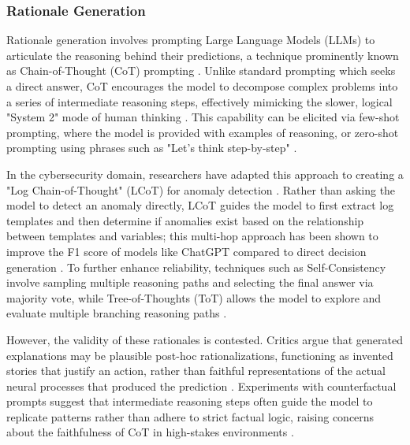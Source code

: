 \subsubsection{Rationale Generation}  
Rationale generation involves prompting Large Language Models (LLMs) to articulate the reasoning behind their predictions, a technique prominently known as Chain-of-Thought (CoT) prompting \cite{XAImersha2024, alammar2024hands}. Unlike standard prompting which seeks a direct answer, CoT encourages the model to decompose complex problems into a series of intermediate reasoning steps, effectively mimicking the slower, logical "System 2" mode of human thinking \cite{alammar2024hands}. This capability can be elicited via few-shot prompting, where the model is provided with examples of reasoning, or zero-shot prompting using phrases such as "Let's think step-by-step" \cite{alammar2024hands}.


In the cybersecurity domain, researchers have adapted this approach to creating a "Log Chain-of-Thought" (LCoT) for anomaly detection \cite{LogFormer}. Rather than asking the model to detect an anomaly directly, LCoT guides the model to first extract log templates and then determine if anomalies exist based on the relationship between templates and variables; this multi-hop approach has been shown to improve the F1 score of models like ChatGPT compared to direct decision generation \cite{LogFormer}. To further enhance reliability, techniques such as Self-Consistency involve sampling multiple reasoning paths and selecting the final answer via majority vote, while Tree-of-Thoughts (ToT) allows the model to explore and evaluate multiple branching reasoning paths \cite{alammar2024hands}.

However, the validity of these rationales is contested. Critics argue that generated explanations may be plausible post-hoc rationalizations, functioning as invented stories that justify an action, rather than faithful representations of the actual neural processes that produced the prediction \cite{AttentionNotExplanation}. Experiments with counterfactual prompts suggest that intermediate reasoning steps often guide the model to replicate patterns rather than adhere to strict factual logic, raising concerns about the faithfulness of CoT in high-stakes environments \cite{XAImersha2024}.

